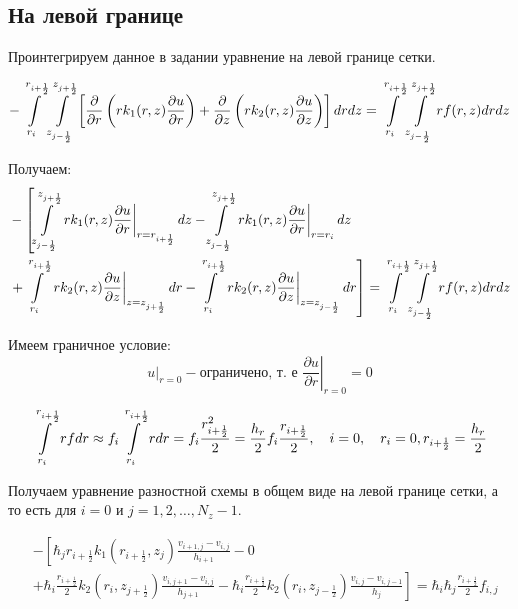 \subsection{На левой границе}

Проинтегрируем данное в задании уравнение на левой границе сетки.

\[
  - \mLim{+\frac{1}{2}}{}{+\frac{1}{2}}{-\frac{1}{2}} \left [ \pdv{}{r} \left ( r k_1(r, z) \pdv{u}{r} \right ) 
  + \pdv{}{z} \left ( rk_2(r, z)\pdv{u}{z} \right ) \right ] dr dz = \mLim{+\frac{1}{2}}{}{+\frac{1}{2}}{-\frac{1}{2}} rf(r, z) dr dz
\]

Получаем:
\begin{align*}
  &- \left [
   \mLimZ{z}{+\frac{1}{2}}{-\frac{1}{2}}{j}  \left . r k_1(r, z) \pdv{u}{r} \right \vert_{r = r_{i + \frac{1}{2}}} dz
  - \mLimZ{z}{+\frac{1}{2}}{-\frac{1}{2}}{j} \left . r k_1(r, z) \pdv{u}{r} \right \vert_{r = r_{i}} dz
  \right . \\
  &\left . + \mLimS{r}{+\frac{1}{2}}{} \left . rk_2(r, z)\pdv{u}{z} \right \vert_{z = z_{j + \frac{1}{2}}} dr
  - \mLimS{r}{+\frac{1}{2}}{} \left . rk_2(r, z)\pdv{u}{z} \right \vert_{z = z_{j - \frac{1}{2}}} dr
  \right ] = \mLim{+\frac{1}{2}}{}{+\frac{1}{2}}{-\frac{1}{2}} rf(r, z) dr dz
\end{align*}

Имеем граничное условие:
\[
  \left . u \right \vert_{r=0} - \text{ограничено, т. е } \left . \frac{\partial u}{ \partial r} \right |_{r = 0} = 0
\]

\[
  \mLimS{r}{+ \frac{1}{2}}{} rf dr \approx f_i \mLimS{r}{ + \frac{1}{2}}{} r dr = 
  f_i \frac{r^2_{i + \frac{1}{2}}}{2} = \frac{h_r}{2} f_i \frac{r_{i + \frac{1}{2}}}{2},
  \quad i = 0, \quad r_i = 0, r_{i + \frac{1}{2}} = \frac{h_r}{2}
\]

Получаем уравнение разностной схемы в общем виде на левой границе сетки, а то есть
для $ i = 0 $ и $ j = 1,2, \dots, N_z-1 $.

\begin{align*}
  &- \left [ 
  \hbar_j r_{i+\frac{1}{2}} k_1(r_{i+\frac{1}{2}}, z_j) \frac{v_{i+1, j} - v_{i, j}}{h_{i + 1}}
  - 0
  \right . \\
  &\left .
  + \hbar_i \frac{r_{i + \frac{1}{2}}}{2} k_2(r_i, z_{j+\frac{1}{2}}) \frac{v_{i, j + 1} - v_{i, j}}{h_{j + 1}}
  - \hbar_i \frac{r_{i + \frac{1}{2}}}{2} k_2(r_i, z_{j-\frac{1}{2}}) \frac{v_{i, j} - v_{i, j - 1}}{h_j}
  \right ]  = \hbar_i \hbar_j \frac{r_{i + \frac{1}{2}}}{2} f_{i, j}
\end{align*}

